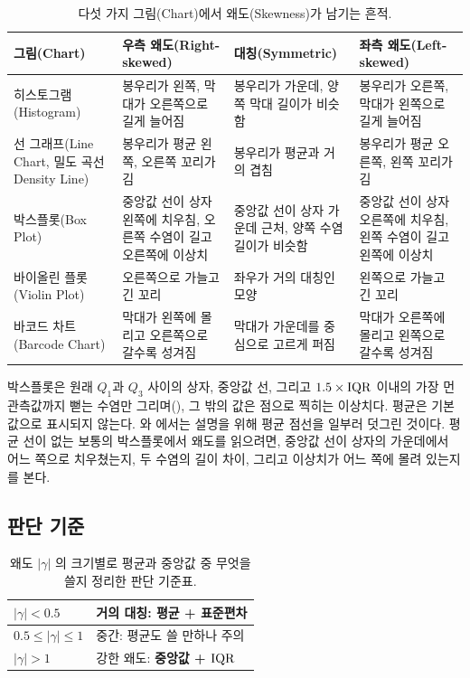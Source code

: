 \begin{table}[H]\centering
\begin{tabularx}{\linewidth}{@{}l X X X@{}}
\toprule
그림(Chart) & 우측 왜도(Right-skewed) & 대칭(Symmetric) & 좌측 왜도(Left-skewed) \\
\midrule
히스토그램(Histogram) & 봉우리가 왼쪽, 막대가 오른쪽으로 길게 늘어짐
  & 봉우리가 가운데, 양쪽 막대 길이가 비슷함
  & 봉우리가 오른쪽, 막대가 왼쪽으로 길게 늘어짐 \\
\midrule
선 그래프(Line Chart, 밀도 곡선 Density Line) & 봉우리가 평균 왼쪽, 오른쪽 꼬리가 김
  & 봉우리가 평균과 거의 겹침
  & 봉우리가 평균 오른쪽, 왼쪽 꼬리가 김 \\
\midrule
박스플롯(Box Plot) & 중앙값 선이 상자 왼쪽에 치우침, 오른쪽 수염이 길고
  오른쪽에 이상치
  & 중앙값 선이 상자 가운데 근처, 양쪽 수염 길이가 비슷함
  & 중앙값 선이 상자 오른쪽에 치우침, 왼쪽 수염이 길고 왼쪽에 이상치 \\
\midrule
바이올린 플롯(Violin Plot) & 오른쪽으로 가늘고 긴 꼬리
  & 좌우가 거의 대칭인 모양
  & 왼쪽으로 가늘고 긴 꼬리 \\
\midrule
바코드 차트(Barcode Chart) & 막대가 왼쪽에 몰리고 오른쪽으로 갈수록 성겨짐
  & 막대가 가운데를 중심으로 고르게 퍼짐
  & 막대가 오른쪽에 몰리고 왼쪽으로 갈수록 성겨짐 \\
\bottomrule
\end{tabularx}
\caption{다섯 가지 그림(Chart)에서 왜도(Skewness)가 남기는 흔적.}
\label{tab:skew-by-chart}
\end{table}

\begin{pitfall}
박스플롯은 원래 $Q_1$과 $Q_3$ 사이의 상자, 중앙값 선, 그리고 $1.5\times\mathrm{IQR}$
이내의 가장 먼 관측값까지 뻗는 수염만 그리며(), 그 밖의 값은
점으로 찍히는 이상치다. 평균은 기본값으로 표시되지 않는다. 와
에서는 설명을 위해 평균 점선을 일부러 덧그린 것이다. 평균 선이
없는 보통의 박스플롯에서 왜도를 읽으려면, 중앙값 선이 상자의 가운데에서 어느 쪽으로
치우쳤는지, 두 수염의 길이 차이, 그리고 이상치가 어느 쪽에 몰려 있는지를 본다.
\end{pitfall}

\subsection{판단 기준}
\label{sec:skew-rule}

\begin{table}[H]\centering
\caption{왜도 $|\gamma|$ 의 크기별로 평균과 중앙값 중 무엇을 쓸지 정리한
판단 기준표.}
\label{tab:desc-skew-rule}
\begin{tabular}{@{}ll@{}}
\toprule
$|\gamma| < 0.5$        & 거의 대칭: 평균 + 표준편차 \\
\midrule
$0.5 \le |\gamma| \le 1$ & 중간: 평균도 쓸 만하나 주의 \\
\midrule
$|\gamma| > 1$          & 강한 왜도: \textbf{중앙값 + $\mathrm{IQR}$} \\
\bottomrule
\end{tabular}
\end{table}

